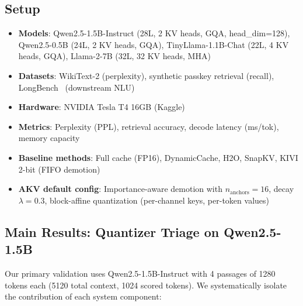 \documentclass[11pt,a4paper]{article}
\begin{document}
\subsection{Setup}

\begin{itemize}
    \item \textbf{Models}: Qwen2.5-1.5B-Instruct (28L, 2 KV heads, GQA, head\_dim=128), Qwen2.5-0.5B (24L, 2 KV heads, GQA), TinyLlama-1.1B-Chat (22L, 4 KV heads, GQA), Llama-2-7B (32L, 32 KV heads, MHA)
    \item \textbf{Datasets}: WikiText-2 (perplexity), synthetic passkey retrieval (recall), LongBench~\cite{longbench} (downstream NLU)
    \item \textbf{Hardware}: NVIDIA Tesla T4 16GB (Kaggle)
    \item \textbf{Metrics}: Perplexity (PPL), retrieval accuracy, decode latency (ms/tok), memory capacity
    \item \textbf{Baseline methods}: Full cache (FP16), DynamicCache, H2O, SnapKV, KIVI 2-bit (FIFO demotion)
    \item \textbf{AKV default config}: Importance-aware demotion with $n_{\text{anchors}}=16$, decay $\lambda=0.3$, block-affine quantization (per-channel keys, per-token values)
\end{itemize}

\subsection{Main Results: Quantizer Triage on Qwen2.5-1.5B}

Our primary validation uses Qwen2.5-1.5B-Instruct with 4 passages of 1280 tokens each (5120 total context, 1024 scored tokens). We systematically isolate the contribution of each system component:
\end{document}
